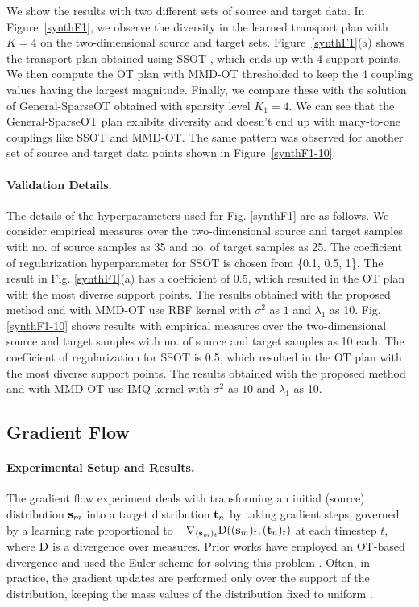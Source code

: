 We show the results with two different sets of source and target data. In Figure~\ref{synthF1}, we observe the diversity in the learned transport plan with $K=4$ on the two-dimensional source and target sets. 
Figure~\ref{synthF1}(a) shows the transport plan obtained using SSOT \citep{blondel18a}, which ends up with 4 support points. We then compute the OT plan with MMD-OT thresholded to keep the 4 coupling values having the largest magnitude. Finally, we compare these with the solution of General-SparseOT obtained with sparsity level $K_1=4$. We can see that the General-SparseOT plan exhibits diversity and doesn't end up with many-to-one couplings like SSOT and MMD-OT. The same pattern was observed for another set of source and target data points shown in Figure~\ref{synthF1-10}.

\paragraph{Validation Details.}
The details of the hyperparameters used for Fig. \ref{synthF1} are as follows. We consider empirical measures over the two-dimensional source and target samples with no. of source samples as 35 and no. of target samples as 25. The coefficient of regularization hyperparameter for SSOT is chosen from \{0.1, 0.5, 1\}. The result in Fig. \ref{synthF1}(a) has a coefficient of 0.5, which resulted in the OT plan with the most diverse support points. The results obtained with the proposed method and with MMD-OT use RBF kernel with $\sigma^2$ as $1$ and $\lambda_1$ as 10. Fig. \ref{synthF1-10} shows results with empirical measures over the two-dimensional source and target samples with no. of source and target samples as 10 each. The coefficient of regularization for SSOT is 0.5, which resulted in the OT plan with the most diverse support points. The results obtained with the proposed method and with MMD-OT use IMQ kernel with $\sigma^2$ as $10$ and $\lambda_1$ as 10.

\subsection{Gradient Flow} 
\paragraph{Experimental Setup and Results.}
The gradient flow experiment deals with transforming an initial (source) distribution $\mathbf{s}_m$ into a target distribution $\mathbf{t}_n$ by taking gradient steps, governed by a learning rate proportional to $-\nabla_{(\mathbf{s}_m)_t}\textup{D}((\mathbf{s}_m)_t, (\mathbf{t}_n)_t)$ at each timestep $t$, where $\textup{D}$ is a divergence over measures.
Prior works have employed an OT-based divergence \citep{fatras2019learnwass, bomb-ot} and used the Euler scheme for solving this problem \citep{FeydySVATP19}. Often, in practice, the gradient updates are performed only over the support of the distribution, keeping the mass values of the distribution fixed to uniform \citep{bomb-ot}. 


